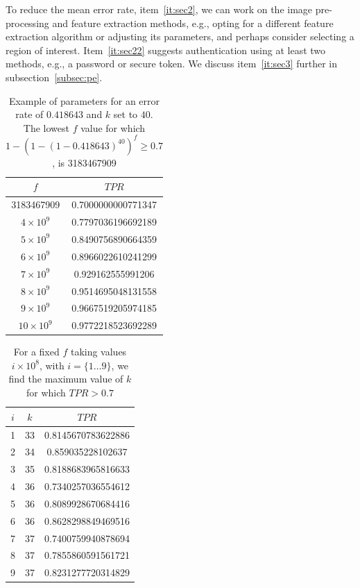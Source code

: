 To reduce the mean error rate, item~\ref{it:sec2}, we can work on the image pre-processing and feature extraction methods, e.g., opting for a different feature extraction algorithm or adjusting its parameters, and perhaps consider selecting a region of interest. Item~\ref{it:sec22} suggests authentication using at least two methods, e.g., a password or secure token. We discuss item~\ref{it:sec3} further in subsection~\ref{subsec:pe}.
\begin{table}[t]
\small
    \centering
    \begin{tabular}{c|c}
        $f$ & $TPR$  \\
        \hline
3183467909 & 0.7000000000771347\\
 $4\times 10^{9}$  & 0.7797036196692189\\
 $5\times 10^{9}$ & 0.8490756890664359\\
 $6\times 10^{9}$ & 0.8966022610241299\\
 $7\times 10^{9}$ & 0.929162555991206\\
 $8\times 10^{9}$ & 0.9514695048131558\\
 $9\times 10^{9}$ & 0.9667519205974185\\
$10\times 10^{9}$ & 0.9772218523692289
    \end{tabular}
    \caption{Example of parameters for an error rate of $0.418643$ and $k$ set to $40$. The lowest $f$ value for which  $1- \left(1 - \left(1 - 0.418643 \right)^{40}\right)^f \geq 0.7$, is 3183467909 }
    \label{tab:40}
\end{table}
\begin{table}[ht]
\small
    \centering
    \begin{tabular}{c|c|c}
         $i$ & $k$ & $TPR$ \\
         \hline
1  &  33  &  0.8145670783622886 \\
2  &  34  &  0.859035228102637 \\
3  &  35  &  0.8188683965816633 \\
4  &  36  &  0.7340257036554612 \\
5  &  36  &  0.8089928670684416 \\
6  &  36  &  0.8628298849469516 \\
7  &  37  &  0.7400759940878694 \\
8  &  37  &  0.7855860591561721 \\
9  &  37  &  0.8231277720314829 
    \end{tabular}
    \caption{For a fixed $f$ taking values $i \times 10^8$, with $i =\{1\dots9\}$, we find the maximum value of $k$ for which $TPR>0.7$}
    \label{tab:10pow8}
\end{table}




